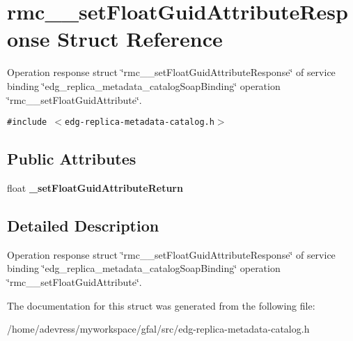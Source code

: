 \section{rmc\_\-\_\-set\-Float\-Guid\-Attribute\-Response Struct Reference}
\label{structrmc____setFloatGuidAttributeResponse}
Operation response struct \char`\"{}rmc\_\-\_\-set\-Float\-Guid\-Attribute\-Response\char`\"{} of service binding \char`\"{}edg\_\-replica\_\-metadata\_\-catalog\-Soap\-Binding\char`\"{} operation \char`\"{}rmc\_\-\_\-set\-Float\-Guid\-Attribute\char`\"{}.  


{\tt \#include $<$edg-replica-metadata-catalog.h$>$}

\subsection*{Public Attributes}
\begin{CompactItemize}
\item 
float \textbf{\_\-set\-Float\-Guid\-Attribute\-Return}\label{structrmc____setFloatGuidAttributeResponse_1b709c4f83c0ceea728f05957590735d}

\end{CompactItemize}


\subsection{Detailed Description}
Operation response struct \char`\"{}rmc\_\-\_\-set\-Float\-Guid\-Attribute\-Response\char`\"{} of service binding \char`\"{}edg\_\-replica\_\-metadata\_\-catalog\-Soap\-Binding\char`\"{} operation \char`\"{}rmc\_\-\_\-set\-Float\-Guid\-Attribute\char`\"{}. 



The documentation for this struct was generated from the following file:\begin{CompactItemize}
\item 
/home/adevress/myworkspace/gfal/src/edg-replica-metadata-catalog.h\end{CompactItemize}
